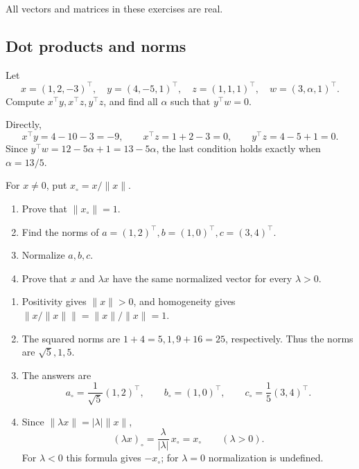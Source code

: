 All vectors and matrices in these exercises are real.

\subsection*{Dot products and norms}

\begin{problem}\label{ex:06:dot-products}
Let
\[
x=(1,2,-3)^\top,\quad y=(4,-5,1)^\top,\quad
z=(1,1,1)^\top,\quad w=(3,\alpha,1)^\top.
\]
Compute \(x^\top y,x^\top z,y^\top z\), and find all \(\alpha\)
such that \(y^\top w=0\).
\end{problem}
\begin{solution}
Directly,
\[
x^\top y=4-10-3=-9,\qquad x^\top z=1+2-3=0,\qquad
y^\top z=4-5+1=0.
\]
Since \(y^\top w=12-5\alpha+1=13-5\alpha\), the last condition
holds exactly when \(\alpha=13/5\).
\end{solution}

\begin{problem}[Normalization]\label{ex:06:normalization}
For \(x\ne0\), put \(x_\circ=x/\|x\|\).
\begin{enumerate}
\item Prove that \(\|x_\circ\|=1\).
\item Find the norms of \(a=(1,2)^\top,b=(1,0)^\top,c=(3,4)^\top\).
\item Normalize \(a,b,c\).
\item Prove that \(x\) and \(\lambda x\) have the same normalized vector
for every \(\lambda>0\).
\end{enumerate}
\end{problem}
\begin{solution}
\begin{enumerate}
\item Positivity gives \(\|x\|>0\), and homogeneity gives
\(\|x/\|x\|\|=\|x\|/\|x\|=1\).
\item The squared norms are \(1+4=5,1,9+16=25\), respectively.
Thus the norms are \(\sqrt5,1,5\).
\item The answers are
\[
a_\circ=\frac1{\sqrt5}(1,2)^\top,\qquad
b_\circ=(1,0)^\top,\qquad c_\circ=\frac15(3,4)^\top.
\]
\item Since \(\|\lambda x\|=|\lambda|\|x\|\),
\[
(\lambda x)_\circ=\frac{\lambda}{|\lambda|}\,x_\circ=x_\circ
\qquad(\lambda>0).
\]
For \(\lambda<0\) this formula gives \(-x_\circ\);
for \(\lambda=0\) normalization is undefined.
\end{enumerate}
\end{solution}

